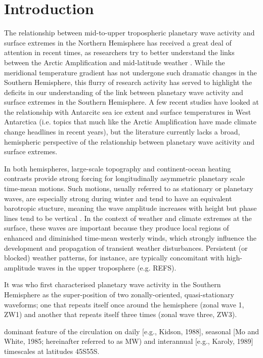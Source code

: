 \section{Introduction}\label{s:introduction}

The relationship between mid-to-upper tropospheric planetary wave activity and surface extremes in the Northern Hemisphere has received a great deal of attention in recent times, as researchers try to better understand the links between the Arctic Amplification and mid-latitude weather \citep[e.g.][]{Cohen2014,Screen2014}. While the meridional temperature gradient has not undergone such dramatic changes in the Southern Hemisphere, this flurry of research activity has served to highlight the deficits in our understanding of the link between planetary wave activity and surface extremes in the Southern Hemisphere. A few recent studies have looked at the relationship with Antarcitc sea ice extent \citep{Raphael2007,Raphael2014} and surface temperatures in West Antarctica \citep{Ding2011,Ding2013} (i.e. topics that much like the Arctic Amplification have made climate change headlines in recent years), but the literature currently lacks a broad, hemispheric perspective of the relationship between planetary wave acitivity and surface extremes. 

In both hemispheres, large-scale topography and continent-ocean heating contrasts provide strong forcing for longitudinally asymmetric planetary scale time-mean motions. Such motions, usually referred to as stationary or planetary waves, are especially strong during winter and tend to have an equivalent barotropic stucture, meaning the wave amplitude increases with height but phase lines tend to be vertical \citep{Holton2013}. In the context of weather and climate extremes at the surface, these waves are important because they produce local regions of enhanced and diminished time-mean westerly winds, which strongly influence the development and propagation of transient weather disturbances. Persistent (or blocked) weather patterns, for instance, are typically concomitant with high-amplitude waves in the upper troposphere (e.g. REFS).

It was \citet{vanLoon1972} who first characterised planetary wave activity in the Southern Hemisphere as the super-position of two zonally-oriented, quasi-stationary waveforms; one that repeats itself once around the hemisphere (zonal wave 1, ZW1) and another that repeats itself three times (zonal wave three, ZW3).  

dominant feature of the circulation on daily [e.g., Kidson, 1988], seasonal [Mo and White,
1985; hereinafter referred to as MW) and interannual [e.g., Karoly, 1989] timescales
at latitudes 45S55S.

